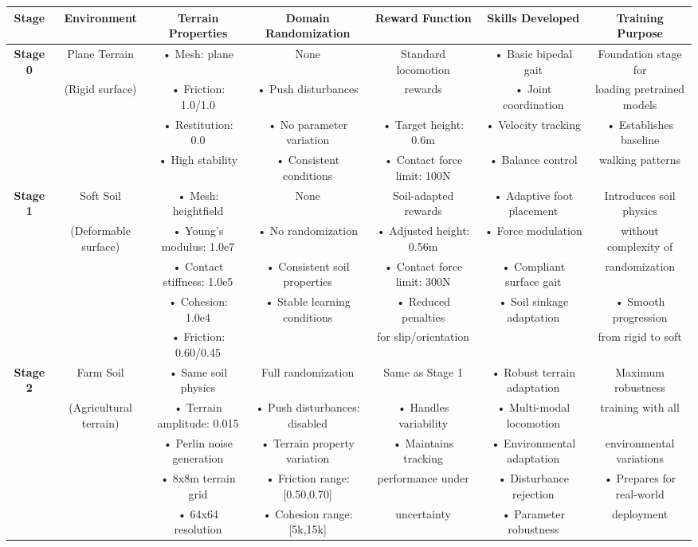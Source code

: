 \documentclass[a1paper,portrait,fontscale=0.5]{baposter}
\begin{document}
\begin{poster}
{\vspace{-1.5em}
\begin{center}
\small
\begin{adjustbox}{max width=\linewidth}
\begin{tabular}{|c|c|c|c|c|c|c|}
  \hline
  \textbf{Stage} & \textbf{Environment} & \textbf{Terrain Properties} & \textbf{Domain Randomization} & \textbf{Reward Function} & \textbf{Skills Developed} & \textbf{Training Purpose} \\
  \hline
  \textbf{Stage 0} & Plane Terrain & • Mesh: plane & None & Standard locomotion & • Basic bipedal gait & Foundation stage for \\
  & (Rigid surface) & • Friction: 1.0/1.0 & • Push disturbances & rewards & • Joint coordination & loading pretrained models \\
  & & • Restitution: 0.0 & • No parameter variation & • Target height: 0.6m & • Velocity tracking & • Establishes baseline \\
  & & • High stability & • Consistent conditions & • Contact force limit: 100N & • Balance control & walking patterns \\
  \hline
  \textbf{Stage 1} & Soft Soil & • Mesh: heightfield & None & Soil-adapted rewards & • Adaptive foot placement & Introduces soil physics \\
  & (Deformable surface) & • Young's modulus: 1.0e7 & • No randomization & • Adjusted height: 0.56m & • Force modulation & without complexity of \\
  & & • Contact stiffness: 1.0e5 & • Consistent soil properties & • Contact force limit: 300N & • Compliant surface gait & randomization \\
  & & • Cohesion: 1.0e4 & • Stable learning conditions & • Reduced penalties & • Soil sinkage adaptation & • Smooth progression \\
  & & • Friction: 0.60/0.45 & & for slip/orientation & & from rigid to soft \\
  \hline
  \textbf{Stage 2} & Farm Soil & • Same soil physics & Full randomization & Same as Stage 1 & • Robust terrain adaptation & Maximum robustness \\
  & (Agricultural terrain) & • Terrain amplitude: 0.015 & • Push disturbances: disabled & • Handles variability & • Multi-modal locomotion & training with all \\
  & & • Perlin noise generation & • Terrain property variation & • Maintains tracking & • Environmental adaptation & environmental variations \\
  & & • 8x8m terrain grid & • Friction range: [0.50,0.70] & performance under & • Disturbance rejection & • Prepares for real-world \\
  & & • 64x64 resolution & • Cohesion range: [5k,15k] & uncertainty & • Parameter robustness & deployment \\
  \hline
\end{tabular}
\end{adjustbox}
\end{center}

}
\end{poster}
\end{document}
